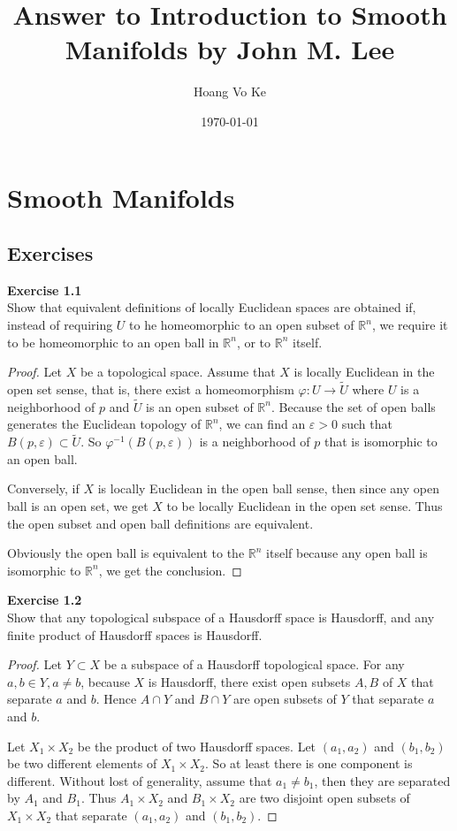 \documentclass[12pt, a4paper]{article}
\title{Answer to Introduction to Smooth Manifolds by John M. Lee}
\author{Hoang Vo Ke}
\date{\today}
\theoremstyle{plain}
\newcommand{\R}{\mathbb{R}}
\def\phi{\varphi}
\def\tilde{\widetilde}
\def\epsilon{\varepsilon}
\newenvironment{exercise}[2][Exercise]
    { \begin{mdframed}[backgroundcolor=gray!20] \textbf{#1 #2} \\}
    {  \end{mdframed}}
\begin{document}
\maketitle
\pagebreak

\section{Smooth Manifolds}

\subsection{Exercises}

\begin{exercise}{1.1}
    Show that equivalent definitions of locally Euclidean spaces are obtained if, instead of requiring $U$ to he homeomorphic to an open subset of $\R^n$, we require it to be homeomorphic to an open ball in $\R^n$, or to $\R^n$ itself.
\end{exercise}
    \begin{proof}
        Let $X$ be a topological space. Assume that $X$ is locally Euclidean in the open set sense, that is, there exist a homeomorphism $\phi\colon U\to \tilde U$ where $U$ is a neighborhood of $p$ and $\tilde U$ is an open subset of $\R^n$. Because the set of open balls generates the Euclidean topology of $\R^n$, we can find an $\epsilon>0$ such that $B(p,\epsilon)\subset \tilde U$. So $\phi^{-1}(B(p,\epsilon))$ is a neighborhood of $p$ that is isomorphic to an open ball.

        Conversely, if $X$ is locally Euclidean in the open ball sense, then since any open ball is an open set, we get $X$ to be locally Euclidean in the open set sense. Thus the open subset and open ball definitions are equivalent. 
        
        Obviously the open ball is equivalent to the $\R^n$ itself because any open ball is isomorphic to $\R^n$, we get the conclusion.
    \end{proof}

\begin{exercise}{1.2}
    Show that any topological subspace of a Hausdorff space is Hausdorff, and any finite product of Hausdorff spaces is Hausdorff.
\end{exercise}
    \begin{proof}
        Let $Y\subset X$ be a subspace of a Hausdorff topological space. For any $a,b\in Y, a\neq b$, because $X$ is Hausdorff, there exist open subsets $A,B$ of $X$ that separate $a$ and $b$. Hence $A\cap Y$ and $B\cap Y$ are open subsets of $Y$ that separate $a$ and $b$.

        Let $X_1\times X_2$ be the product of two Hausdorff spaces. Let $(a_1,a_2)$ and $(b_1,b_2)$ be two different elements of $X_1\times X_2$. So at least there is one component is different. Without lost of generality, assume that $a_1\neq b_1$, then they are separated by $A_1$ and $B_1$. Thus $A_1\times X_2$ and $B_1\times X_2$ are two disjoint open subsets of $X_1\times X_2$ that separate $(a_1,a_2)$ and $(b_1,b_2)$. 
    \end{proof}
\end{document}
